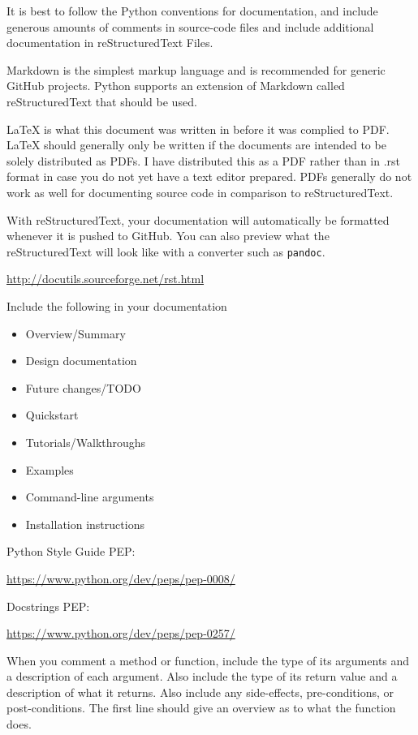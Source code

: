 \documentclass{article}
\begin{document}
It is best to follow the Python conventions for documentation, 
and include generous amounts of comments in source-code files
and include additional documentation in reStructuredText Files.

Markdown is the simplest markup language and is recommended for generic
GitHub projects. Python supports an extension of Markdown called
reStructuredText that should be used.

LaTeX is what this document was written in before it was 
complied to PDF. LaTeX should generally only be written
if the documents are intended to be solely distributed as PDFs.
I have distributed this as a PDF rather than in .rst format
in case you do not yet have a text editor prepared.
PDFs generally do not work as well for documenting source code
in comparison to reStructuredText.

With reStructuredText, your documentation will automatically
be formatted whenever it is pushed to GitHub. 
You can also preview what the reStructuredText will look like
with a converter such as \texttt{pandoc}.

\url{http://docutils.sourceforge.net/rst.html}

Include the following in your documentation

\begin{itemize}
\item Overview/Summary
\item Design documentation
\item Future changes/TODO
\item Quickstart
\item Tutorials/Walkthroughs
\item Examples
\item Command-line arguments
\item Installation instructions
\end{itemize}

Python Style Guide PEP:

\url{https://www.python.org/dev/peps/pep-0008/}

Docstrings PEP:

\url{https://www.python.org/dev/peps/pep-0257/}

When you comment a method or function,
include the type of its arguments and a description
of each argument. Also include the type of its return value
and a description of what it returns.
Also include any side-effects, pre-conditions, or post-conditions.
The first line should give an overview as to what the function does.
\end{document}
